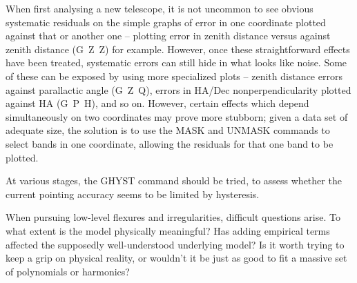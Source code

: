When first analysing a new telescope, it is not uncommon to see
obvious systematic residuals on the simple graphs of error in
one coordinate plotted against that or another one -- plotting
error in zenith distance versus against zenith distance (G~Z~Z) for
example.  However, once these straightforward effects
have been treated, systematic errors can still hide in what looks
like noise.  Some of
these can be exposed by using more specialized plots -- zenith
distance errors against parallactic angle (G~Z~Q), errors
in HA/Dec nonperpendicularity plotted against HA (G~P~H),
and so on.  However,
certain effects which depend simultaneously on two coordinates may
prove more stubborn;
given a data set of adequate size,
the solution is to use the MASK and UNMASK commands to select bands
in one coordinate, allowing the residuals for that one band to be
plotted.

At various stages, the GHYST command should be tried, to assess
whether the current pointing accuracy seems to be limited by
hysteresis.

When pursuing low-level flexures and irregularities, difficult
questions arise.  To what extent is the model physically meaningful?
Has adding empirical terms affected the supposedly well-understood
underlying model?  Is it worth trying to keep a grip on
physical reality, or wouldn't it be just as good to fit a
massive set of polynomials or harmonics?

